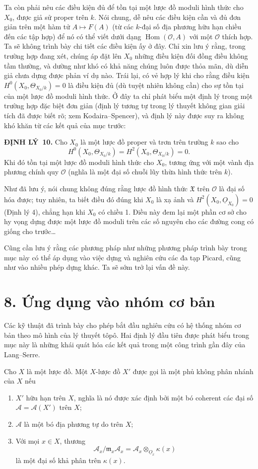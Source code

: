 \documentclass[11pt,twoside,openany]{book}
\numberwithin{equation}{section}
\newcommand{\src}[1]{%
  \phantomsection\hypertarget{src:\fgasourceid:#1}{}%
  \marginpar{\raggedleft\footnotesize\sffamily #1}%
}
\newcommand{\fgasourceid}{unset}
\newcommand{\Osh}{\underline{O}}
\newcommand{\fsection}[2]{%
  \section*{#1. #2}%
  \addcontentsline{toc}{section}{#1. #2}%
}
\newcommand{\result}[2]{\par\medskip\noindent\textbf{#1\if\relax\detokenize{#2}\relax\else\ #2\fi.}\quad}
\begin{document}
\src{209}
Ta còn phải nêu các điều kiện đủ để tồn tại một lược đồ moduli hình thức cho
$X_0$, được giả sử proper trên $k$. Nói chung, dễ nêu các điều kiện cần và đủ
đơn giản trên một hàm tử $A\longmapsto F(A)$ (từ các $k$-đại số địa phương
hữu hạn chiều đến các tập hợp) để nó có thể viết dưới dạng
$\operatorname{Hom}(\mathcal O,A)$ với một $\mathcal O$ thích hợp. Ta sẽ
không trình bày chi tiết các điều kiện ấy ở đây. Chỉ xin lưu ý rằng, trong
trường hợp đang xét, chúng áp đặt lên $X_0$ những điều kiện đối đồng điều không
tầm thường, và dường như khó có khả năng chúng luôn được thỏa mãn, dù diễn giả
chưa dựng được phản ví dụ nào. Trái lại, có vẻ hợp lý khi cho rằng điều kiện
$H^0(X_0,\Theta_{X_0/k})=0$ là điều kiện đủ (dù tuyệt nhiên không cần) cho sự
tồn tại của một lược đồ moduli hình thức. Ở đây ta chỉ phát biểu một định lý
trong một trường hợp đặc biệt đơn giản (định lý tương tự trong lý thuyết không
gian giải tích đã được biết rõ; xem Kodaira--Spencer), và định lý này được suy
ra không khó khăn từ các kết quả của mục trước:

\result{ĐỊNH LÝ}{10} Cho $X_0$ là một lược đồ proper và trơn trên trường $k$
sao cho
\[
  H^0(X_0,\Theta_{X_0/k})=H^2(X_0,\Theta_{X_0/k})=0.
\]
Khi đó tồn tại một lược đồ moduli hình thức cho $X_0$, tương ứng với một vành
địa phương chính quy $\mathcal O$ (nghĩa là một đại số chuỗi lũy thừa hình thức
trên $k$).

Như đã lưu ý, nói chung không đúng rằng lược đồ hình thức $\mathfrak X$ trên
$\mathcal O$ là đại số hóa được; tuy nhiên, ta biết điều đó đúng khi $X_0$ là
xạ ảnh và $H^2(X_0,\Osh_{X_0})=0$ (Định lý 4), chẳng hạn khi $X_0$ có chiều
1. Điều này đem lại một phần cơ sở cho hy vọng dựng được một lược đồ moduli
trên các số nguyên cho các đường cong có giống cho trước\ldots{}

Cũng cần lưu ý rằng các phương pháp như những phương pháp trình bày trong mục
này có thể áp dụng vào việc dựng và nghiên cứu các đa tạp Picard, cũng như vào
nhiều phép dựng khác. Ta sẽ sớm trở lại vấn đề này.

\fsection{8}{Ứng dụng vào nhóm cơ bản}

Các kỹ thuật đã trình bày cho phép bắt đầu nghiên cứu có hệ thống nhóm cơ bản
theo mô hình của lý thuyết tôpô. Hai định lý đầu tiên được phát biểu trong mục
này là những khái quát hóa các kết quả trong một công trình gần đây của
Lang--Serre.

Cho $X$ là một lược đồ. Một $X$-lược đồ $X'$ được gọi là một phủ không phân
nhánh của $X$ nếu
\begin{enumerate}
  \item[\textit{i.}] $X'$ hữu hạn trên $X$, nghĩa là nó được xác định bởi một
    bó coherent các đại số $\mathcal A=\mathcal A(X')$ trên $X$;
  \item[\textit{ii.}] $\mathcal A$ là một bó địa phương tự do trên $X$;
  \item[\textit{iii.}] Với mọi $x\in X$, thương
    \[
      \mathcal A_x/\mathfrak m_x\mathcal A_x
      =\mathcal A_x\otimes_{\Osh_x}\kappa(x)
    \]
    là một đại số khả phân trên $\kappa(x)$.
\end{enumerate}
\end{document}
